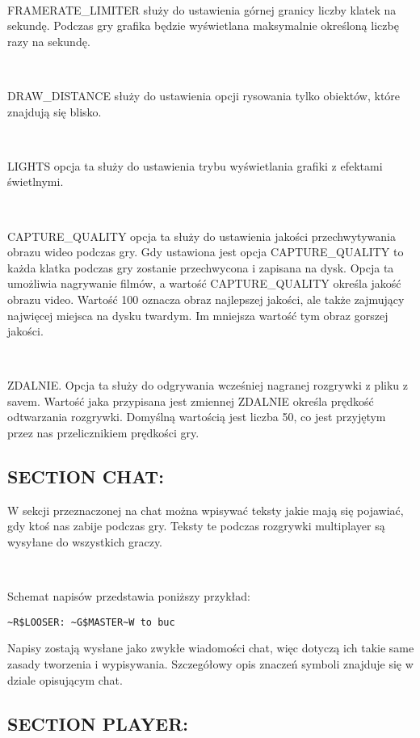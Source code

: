 \documentclass[licencjacka]{pracamgr}
\begin{document}
\ \

FRAMERATE\_LIMITER służy do ustawienia górnej granicy liczby klatek na sekundę. Podczas gry grafika będzie wyświetlana maksymalnie określoną liczbę razy na sekundę.

\ \

DRAW\_DISTANCE służy do ustawienia opcji rysowania tylko obiektów, które znajdują się blisko.

\ \

LIGHTS opcja ta służy do ustawienia trybu wyświetlania grafiki z efektami świetlnymi.

\ \

CAPTURE\_QUALITY opcja ta służy do ustawienia jakości przechwytywania obrazu wideo podczas gry. Gdy ustawiona jest opcja CAPTURE\_QUALITY to każda klatka podczas gry zostanie przechwycona i zapisana na dysk. Opcja ta umożliwia nagrywanie filmów, a wartość CAPTURE\_QUALITY określa jakość obrazu video. Wartość 100 oznacza obraz najlepszej jakości, ale także zajmujący najwięcej miejsca na dysku twardym. Im mniejsza wartość tym obraz gorszej jakości.

\ \

ZDALNIE. Opcja ta służy do odgrywania wcześniej nagranej rozgrywki z pliku z savem.
Wartość jaka przypisana jest zmiennej ZDALNIE określa prędkość odtwarzania rozgrywki.
Domyślną wartością jest liczba 50, co jest przyjętym przez nas przelicznikiem prędkości gry.

\subsection{SECTION CHAT:}

W sekcji przeznaczonej na chat można wpisywać teksty jakie mają się pojawiać, gdy ktoś nas zabije podczas gry. Teksty te podczas rozgrywki multiplayer są wysyłane do wszystkich graczy.

\ \

Schemat napisów przedstawia poniższy przykład:

\begin{verbatim}
~R$LOOSER: ~G$MASTER~W to buc
\end{verbatim}

Napisy zostają wysłane jako zwykłe wiadomości chat, więc dotyczą ich takie same zasady tworzenia i wypisywania. Szczegółowy opis znaczeń symboli znajduje się w dziale opisującym chat.

\subsection{SECTION PLAYER:}
\end{document}
